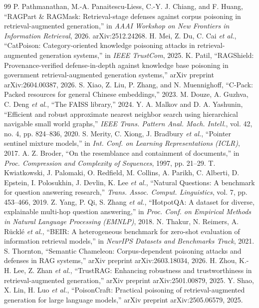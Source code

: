 \documentclass[conference]{IEEEtran}
\begin{document}
\begin{thebibliography}{99}
 P. Pathmanathan, M.-A. Panaitescu-Liess, C.-Y. J. Chiang, and F. Huang, ``RAGPart \& RAGMask: Retrieval-stage defenses against corpus poisoning in retrieval-augmented generation,'' in \emph{AAAI Workshop on New Frontiers in Information Retrieval}, 2026. arXiv:2512.24268.
 H. Mei, Z. Du, C. Cai \emph{et al.}, ``CatPoison: Category-oriented knowledge poisoning attacks in retrieval-augmented generation systems,'' in \emph{IEEE TrustCom}, 2025.
 K. Patil, ``RAGShield: Provenance-verified defense-in-depth against knowledge base poisoning in government retrieval-augmented generation systems,'' arXiv preprint arXiv:2604.00387, 2026.
 S. Xiao, Z. Liu, P. Zhang, and N. Muennighoff, ``C-Pack: Packed resources for general Chinese embeddings,'' 2023.
 M. Douze, A. Guzhva, C. Deng \emph{et al.}, ``The FAISS library,'' 2024.
 Y. A. Malkov and D. A. Yashunin, ``Efficient and robust approximate nearest neighbor search using hierarchical navigable small world graphs,'' \emph{IEEE Trans. Pattern Anal. Mach. Intell.}, vol. 42, no. 4, pp. 824--836, 2020.
 S. Merity, C. Xiong, J. Bradbury \emph{et al.}, ``Pointer sentinel mixture models,'' in \emph{Int. Conf. on Learning Representations (ICLR)}, 2017.
 A. Z. Broder, ``On the resemblance and containment of documents,'' in \emph{Proc. Compression and Complexity of Sequences}, 1997, pp. 21--29.
 T. Kwiatkowski, J. Palomaki, O. Redfield, M. Collins, A. Parikh, C. Alberti, D. Epstein, I. Polosukhin, J. Devlin, K. Lee \emph{et al.}, ``Natural Questions: A benchmark for question answering research,'' \emph{Trans. Assoc. Comput. Linguistics}, vol. 7, pp. 453--466, 2019.
 Z. Yang, P. Qi, S. Zhang \emph{et al.}, ``HotpotQA: A dataset for diverse, explainable multi-hop question answering,'' in \emph{Proc. Conf. on Empirical Methods in Natural Language Processing (EMNLP)}, 2018.
 N. Thakur, N. Reimers, A. R\"{u}ckl\'{e} \emph{et al.}, ``BEIR: A heterogeneous benchmark for zero-shot evaluation of information retrieval models,'' in \emph{NeurIPS Datasets and Benchmarks Track}, 2021.
 S. Thornton, ``Semantic Chameleon: Corpus-dependent poisoning attacks and defenses in RAG systems,'' arXiv preprint arXiv:2603.18034, 2026.
 H. Zhou, K.-H. Lee, Z. Zhan \emph{et al.}, ``TrustRAG: Enhancing robustness and trustworthiness in retrieval-augmented generation,'' arXiv preprint arXiv:2501.00879, 2025.
 Y. Shao, X. Lin, H. Luo \emph{et al.}, ``PoisonCraft: Practical poisoning of retrieval-augmented generation for large language models,'' arXiv preprint arXiv:2505.06579, 2025.

\end{thebibliography}
\end{document}
